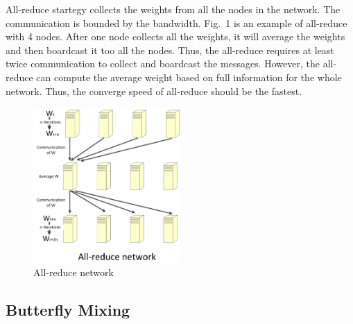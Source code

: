 \documentclass{article}
\begin{document}
All-reduce startegy collects the weights from all the nodes in the network. The communication is bounded by the bandwidth. Fig.~1 is an example of all-reduce with 4 nodes. After one node collects all the weights, it will average the weights and then boardcast it too all the nodes. Thus, the all-reduce requires at least twice communication to collect and boardcast the messages. However, the all-reduce can compute the average weight based on full information for the whole network. Thus, the converge speed of all-reduce should be the fastest.
\begin{figure}[htb]
  \centering
  \includegraphics[width=0.5\textwidth]{allreduce.jpg}
  \caption{All-reduce network}
\end{figure}
\subsection{Butterfly Mixing}
 
\end{document}
